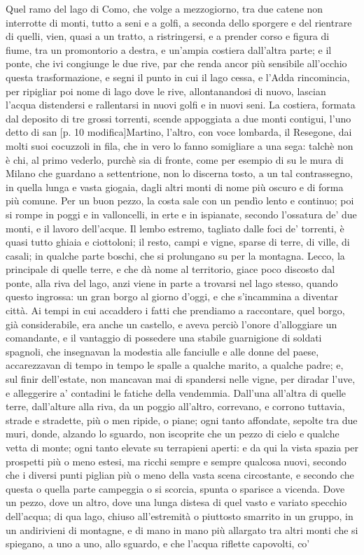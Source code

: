 \documentclass[11pt,a4paper]{book}
\begin{document}
\beginnumbering
\pstart
Quel ramo del lago di Como, che volge a mezzogiorno, tra due catene non interrotte di monti, tutto a seni e a golfi, a seconda dello sporgere e del rientrare di quelli, vien, quasi a un tratto, a ristringersi, e a prender corso e figura di fiume, tra un promontorio a destra, e un’ampia costiera dall’altra parte; e il ponte, che ivi congiunge le due rive, par che renda ancor più sensibile all’occhio questa trasformazione, e segni il punto in cui il lago cessa, e l’Adda rincomincia, per ripigliar poi nome di lago dove le rive, allontanandosi di nuovo, lascian l’acqua distendersi e rallentarsi in nuovi golfi e in nuovi seni. La costiera, formata dal deposito di tre grossi torrenti, scende appoggiata a due monti contigui, l’uno detto di san [p. 10 modifica]Martino, l’altro, con voce lombarda, il Resegone, dai molti suoi cocuzzoli in fila, che in vero lo fanno somigliare a una sega: talchè non è chi, al primo vederlo, purchè sia di fronte, come per esempio di su le mura di Milano che guardano a settentrione, non lo discerna tosto, a un tal contrassegno, in quella lunga e vasta giogaia, dagli altri monti di nome più oscuro e di forma più comune. Per un buon pezzo, la costa sale con un pendìo lento e continuo; poi si rompe in poggi e in valloncelli, in erte e in ispianate, secondo l’ossatura de’ due monti, e il lavoro dell’acque. Il lembo estremo, tagliato dalle foci de’ torrenti, è quasi tutto ghiaia e ciottoloni; il resto, campi e vigne, sparse di terre, di ville, di casali; in qualche parte boschi, che si prolungano su per la montagna. Lecco, la principale di quelle terre, e che dà nome al territorio, giace poco discosto dal ponte, alla riva del lago, anzi viene in parte a trovarsi nel lago stesso, quando questo ingrossa: un gran borgo al giorno d’oggi, e che s’incammina a diventar città. Ai tempi in cui accaddero i fatti che prendiamo a raccontare, quel borgo, già considerabile, era anche un castello, e aveva perciò l’onore d’alloggiare un comandante, e il vantaggio di possedere una stabile guarnigione di soldati spagnoli, che insegnavan la modestia alle fanciulle e alle donne del paese, accarezzavan di tempo in tempo le spalle a qualche marito, a qualche padre; e, sul finir dell’estate, non mancavan mai di spandersi nelle vigne, per diradar l’uve, e alleggerire a’ contadini le fatiche della vendemmia. Dall’una all’altra di quelle terre, dall’alture alla riva, da un poggio all’altro, correvano, e corrono tuttavia, strade e stradette, più o men ripide, o piane; ogni tanto affondate, sepolte tra due muri, donde, alzando lo sguardo, non iscoprite che un pezzo di cielo e qualche vetta di monte; ogni tanto elevate su terrapieni aperti: e da qui la vista spazia per prospetti più o meno estesi, ma ricchi sempre e sempre qualcosa nuovi, secondo che i diversi punti piglian più o meno della vasta scena circostante, e secondo che questa o quella parte campeggia o si scorcia, spunta o sparisce a vicenda. Dove un pezzo, dove un altro, dove una lunga distesa di quel vasto e variato specchio dell’acqua; di qua lago, chiuso all’estremità o piuttosto smarrito in un gruppo, in un andirivieni di montagne, e di mano in mano più allargato tra altri monti che si spiegano, a uno a uno, allo sguardo, e che l’acqua riflette capovolti, co’ 
\end{document}
